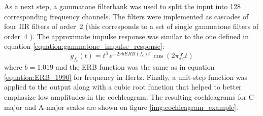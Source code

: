 As a next step, a gammatone filterbank was used to split the input into 128 corresponding frequency channels. The filters were implemented as cascades of four IIR filters of order~2 (this corresponds to a set of single gammatone filters of order~4 \cite{brian2hears}). The approximate impulse response was similar to the one defined in equation \ref{equation:gammatone_impulse_response}:
\begin{equation}
	g_{f_c}(t) = t^3\,e^{-2\pi{}bERB(f_c)t}\,\cos(2\pi{}f_c{}t)
\end{equation}
where $b=1.019$ and the ERB function was the same as in equation \ref{equation:ERB_1990} for frequency in Hertz. Finally, a unit-step function was applied to the output along with a cubic root function that helped to better emphasize low amplitudes in the cochleagram. The resulting cochleagrams for C-major and A-major scales are shown on figure \ref{img:cochleagram_example}.\\

